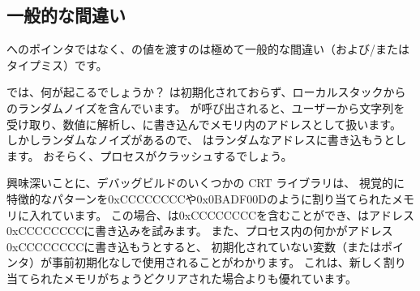 \subsection{一般的な間違い}

へのポインタではなく、の値を渡すのは極めて一般的な間違い（および/またはタイプミス）です。



では、何が起こるでしょうか？ 
は初期化されておらず、ローカルスタックからのランダムノイズを含んでいます。 
\scanf が呼び出されると、ユーザーから文字列を受け取り、数値に解析し、に書き込んでメモリ内のアドレスとして扱います。 
しかしランダムなノイズがあるので、 \scanf はランダムなアドレスに書き込もうとします。 
おそらく、プロセスがクラッシュするでしょう。

興味深いことに、デバッグビルドのいくつかの \ac{CRT} ライブラリは、
視覚的に特徴的なパターンを0xCCCCCCCCや0x0BADF00Dのように割り当てられたメモリに入れています。 
この場合、は0xCCCCCCCCを含むことができ、\scanf はアドレス0xCCCCCCCCに書き込みを試みます。 
また、プロセス内の何かがアドレス0xCCCCCCCCに書き込もうとすると、
初期化されていない変数（またはポインタ）が事前初期化なしで使用されることがわかります。 
これは、新しく割り当てられたメモリがちょうどクリアされた場合よりも優れています。

